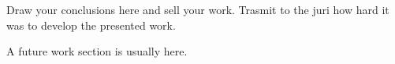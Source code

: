 \label{ch:conclusions}
Draw your conclusions here and sell your work. Trasmit to the juri how hard it was to develop the presented work.

A future work section is usually here.

\cleardoublepage
 
